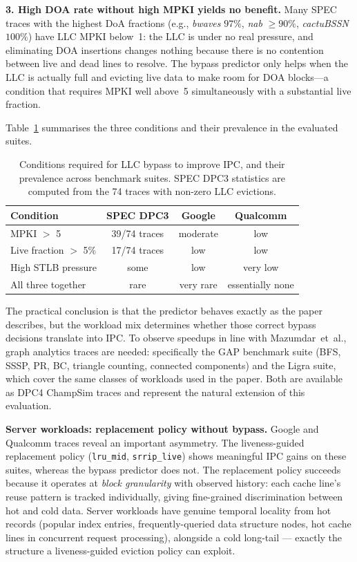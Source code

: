 \documentclass[12pt]{article}
\begin{document}
\textbf{3. High DOA rate without high MPKI yields no benefit.}
Many SPEC traces with the highest DoA fractions (e.g., \emph{bwaves}
$97\%$, \emph{nab} $\geq 90\%$, \emph{cactuBSSN} $100\%$) have LLC MPKI
below~1: the LLC is under no real pressure, and eliminating DOA insertions
changes nothing because there is no contention between live and dead lines
to resolve.
The bypass predictor only helps when the LLC is actually full and evicting
live data to make room for DOA blocks---a condition that requires MPKI well
above~5 simultaneously with a substantial live fraction.

Table~\ref{tab:workload_sweet_spot} summarises the three conditions and
their prevalence in the evaluated suites.

\begin{table}[htbp]
  \centering
  \caption{Conditions required for LLC bypass to improve IPC, and their
           prevalence across benchmark suites.
           SPEC DPC3 statistics are computed from the 74 traces with
           non-zero LLC evictions.}
  \label{tab:workload_sweet_spot}
  \begin{tabular}{lccc}
    \toprule
    Condition & SPEC DPC3 & Google & Qualcomm \\
    \midrule
    MPKI $>$ 5           & 39/74 traces & moderate & low \\
    Live fraction $>$ 5\% & 17/74 traces & low      & low \\
    High STLB pressure   & some         & low      & very low \\
    All three together   & rare         & very rare & essentially none \\
    \bottomrule
  \end{tabular}
\end{table}

The practical conclusion is that the predictor behaves exactly as
the paper describes, but the workload mix determines whether those correct
bypass decisions translate into IPC.
To observe speedups in line with Mazumdar~et~al., graph analytics traces
are needed: specifically the GAP benchmark suite (BFS, SSSP, PR, BC,
triangle counting, connected components) and the Ligra suite, which cover
the same classes of workloads used in the paper.
Both are available as DPC4 ChampSim traces and represent the natural
extension of this evaluation.

\textbf{Server workloads: replacement policy without bypass.}
Google and Qualcomm traces reveal an important asymmetry.
The liveness-guided replacement policy (\texttt{lru\_mid}, \texttt{srrip\_live})
shows meaningful IPC gains on these suites, whereas the bypass predictor does not.
The replacement policy succeeds because it operates at \emph{block granularity}
with observed history: each cache line's reuse pattern is tracked individually,
giving fine-grained discrimination between hot and cold data.
Server workloads have genuine temporal locality from hot records
(popular index entries, frequently-queried data structure nodes, hot cache lines
in concurrent request processing), alongside a cold long-tail ---
exactly the structure a liveness-guided eviction policy can exploit.
\end{document}
